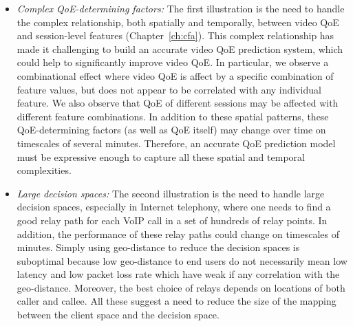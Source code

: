 \begin{itemize}

\item {\em Complex QoE-determining factors:} 
The first illustration is the need to handle the complex relationship, both spatially 
and temporally, between video QoE and session-level features (Chapter~\ref{ch:cfa}).
This complex relationship has made it challenging to build an accurate video 
QoE prediction system, which could help to significantly improve video QoE.
In particular, we observe a combinational effect where video QoE is affect by 
a specific combination of feature values, but does not appear to be correlated 
with any individual feature. We also observe that QoE of different sessions 
may be affected with different feature combinations. In addition to these spatial 
patterns, these QoE-determining factors (as well as QoE itself) may change
over time on timescales of several minutes. Therefore, an accurate QoE 
prediction model must be expressive enough to capture all these spatial and 
temporal complexities.

\item {\em Large decision spaces:}
The second illustration is the need to handle large decision spaces, especially in 
Internet telephony, where one needs to find a good relay path for each VoIP call
in a set of hundreds of relay points.
In addition, the performance of these relay paths could change on timescales 
of minutes.
Simply using geo-distance to reduce the decision spaces is suboptimal because 
low geo-distance to end users do not necessarily mean low latency and low packet 
loss rate which  have weak if any correlation with the geo-distance. Moreover, the 
best choice of relays depends  on locations of both caller and callee.
All these suggest a need to reduce the size of the mapping between
the client space and the decision space.

\end{itemize}



